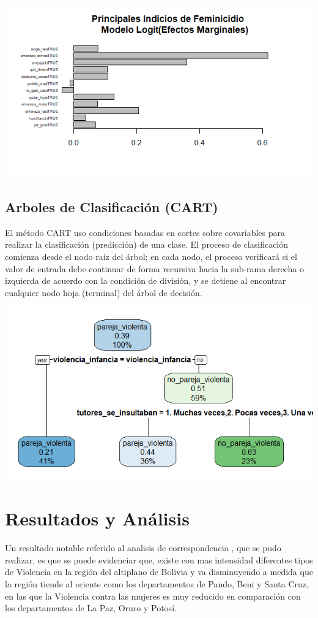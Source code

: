 \documentclass[11pt,letter]{article}
\begin{document}
\includegraphics{calsifica_logit.png}
\subsection{Arboles de Clasificación (CART) }
El método CART uso condiciones basadas en cortes sobre covariables para realizar la clasificación (predicción) de una clase. El proceso de clasificación comienza desde el nodo raíz del árbol; en cada nodo, el proceso verificará si el valor de entrada debe continuar de forma recursiva hacia la sub-rama derecha o izquierda de acuerdo con la condición de división, y se detiene al encontrar cualquier nodo hoja (terminal) del árbol de decisión.

\includegraphics{cart.png}

\section{Resultados y Análisis}


Un resultado notable referido al analisis de correspondencia , que se pudo realizar, es que se puede evidenciar que, existe con mas intensidad diferentes tipos de Violencia en la región del altiplano de Bolivia y va disminuyendo a medida que la región tiende al oriente como los departamentos de Pando, Beni y Santa Cruz, en las que la Violencia contra las mujeres es muy reducido en comparación con los departamentos de La Paz, Oruro y Potosí.
\end{document}

